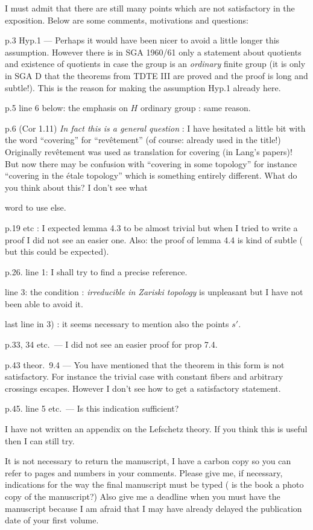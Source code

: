 \documentclass[11pt,a4paper]{article}
\begin{document}
I must admit that there are still many points which are not satisfactory in the
exposition. Below are some comments, motivations and questions:

p.3 Hyp.1 --- Perhaps it would have been nicer to avoid a little longer this
assumption. However there is in SGA 1960/61 only a statement about quotients
and existence of quotients in case the group is an \emph{ordinary} finite group
(it is only in SGA D that the theorems from TDTE III are proved and the proof
is long and subtle!). This is the reason for making the assumption Hyp.1
already here.

p.5 line 6 below: the emphasis on $H$ ordinary group : same reason.

p.6 (Cor 1.11) \emph{In fact this is a general question} : I have hesitated a
little bit with the word ``covering'' for ``revêtement'' (of course: already
used in the title!) Originally revêtement was used as translation  for covering (in Lang's papers)! But now there may be confusion with
``covering in some topology'' for instance ``covering in the étale topology''
which is something entirely different. What do you think about this? I don't
see what

word to use else.

p.19 etc : I expected lemma 4.3 to be almost trivial but when I tried to write
a proof I did not see an easier one. Also: the proof of lemma 4.4 is kind of
subtle ( but this could be expected).

p.26. line 1: I shall try to find a precise reference.

line 3: the condition : \emph{irreducible in Zariski topology} is unpleasant
but I have not been able to avoid it.

last line in 3) : it seems necessary to mention also the points $s'$.

p.33, 34 etc.\ --- I did not see an easier proof for prop 7.4.

p.43 theor.\ 9.4 --- You have mentioned that the theorem in this form is not
satisfactory. For instance the trivial case with constant fibers and arbitrary
crossings escapes. However I don't see how to get a satisfactory statement.

p.45. line 5 etc.\ --- Is this indication sufficient?

I have not written an appendix on the Lefschetz theory. If you think this is
useful then I can still try.

It is not necessary to return the manuscript, I have a carbon copy so you can
refer to pages and numbers in your comments. Please give me, if necessary,
indications for the way the final manuscript must be typed ( is the book a
 photo copy of the manuscript?) Also give me a deadline when you
must have the manuscript because I am afraid that I may have already delayed
the publication date of your first volume.
\end{document}
